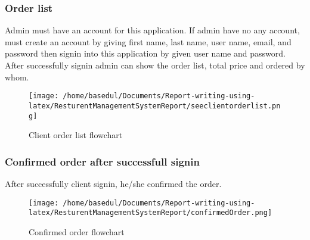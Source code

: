 \documentclass[12pt,a4paper]{article}
\newcommand\tab[1][1cm]{\hspace*{#1}}
\begin{document}
	\subsubsection{Order list}
		\tab Admin must have an account for this application. If admin have no any account, must create an account by giving first name, last name, user name, email, and password then signin into this application by given user name and password. After successfully signin admin can show the order list, total price and ordered by whom.
		\begin{figure}[H]
		\centering
		\texttt{[image: /home/basedul/Documents/Report-writing-using-latex/ResturentManagementSystemReport/seeclientorderlist.png]}
		\caption{Client order list flowchart}
		\label{fig:seeclientorderlist} 
		\end{figure}
		
	\subsubsection{Confirmed order after successfull signin}
		\tab After successfully client signin, he/she confirmed the order.
		\begin{figure}[H]
		\centering
		\texttt{[image: /home/basedul/Documents/Report-writing-using-latex/ResturentManagementSystemReport/confirmedOrder.png]}
		\caption{Confirmed order flowchart}
		\label{fig:confirmedOrder} 
		\end{figure}
		

		
		
\end{document}
